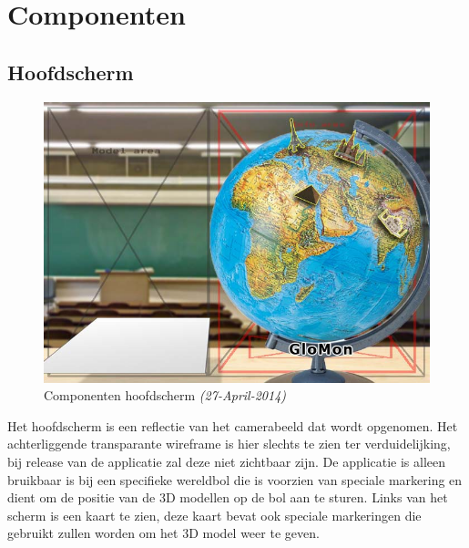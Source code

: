 \chapter{Componenten} \label{cha:componenten}


\section{Hoofdscherm} \label{sec:hoofdscherm}
\begin{figure}[h]
  \includegraphics[width=130mm]{figs/components1a.jpg}
  \caption{Componenten hoofdscherm \textit{(27-April-2014)}}
  \label{fig:components1}
\end{figure}

Het hoofdscherm is een reflectie van het camerabeeld dat wordt opgenomen. Het achterliggende transparante wireframe is hier slechts te zien ter verduidelijking, bij release van de applicatie zal deze niet  zichtbaar zijn. De applicatie is alleen bruikbaar is bij een specifieke wereldbol die is voorzien van speciale markering en dient om de positie van de 3D modellen op de bol aan te sturen. Links van het scherm is een kaart te zien, deze kaart bevat ook speciale markeringen die gebruikt zullen worden om het 3D model weer te geven.

\newpage
